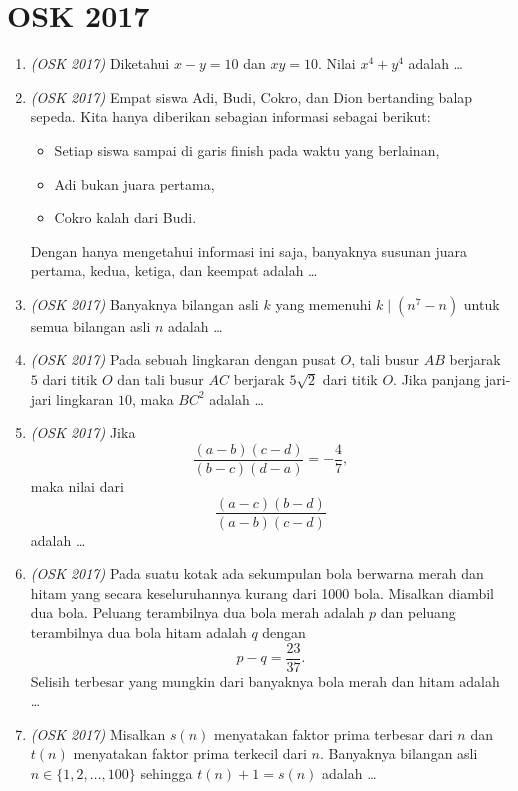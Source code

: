 \documentclass[11pt]{scrartcl}
\begin{document}
\newpage
\section{OSK 2017}

\begin{enumerate}
    \item \textit{(OSK 2017)}  Diketahui $x - y = 10$ dan $xy = 10$. Nilai $x^4 + y^4$ adalah \dots

    \item \textit{(OSK 2017)}  Empat siswa Adi, Budi, Cokro, dan Dion bertanding balap sepeda. Kita hanya diberikan sebagian informasi sebagai berikut:
    \begin{itemize}
        \item Setiap siswa sampai di garis finish pada waktu yang berlainan,
        \item Adi bukan juara pertama,
        \item Cokro kalah dari Budi.
    \end{itemize}
    Dengan hanya mengetahui informasi ini saja, banyaknya susunan juara pertama, kedua, ketiga, dan keempat adalah \dots

    \item \textit{(OSK 2017)}  Banyaknya bilangan asli $k$ yang memenuhi $k \mid (n^7 - n)$ untuk semua bilangan asli $n$ adalah \dots

    \item \textit{(OSK 2017)}  Pada sebuah lingkaran dengan pusat $O$, tali busur $AB$ berjarak $5$ dari titik $O$ dan tali busur $AC$ berjarak $5\sqrt{2}$ dari titik $O$. Jika panjang jari-jari lingkaran $10$, maka $BC^2$ adalah \dots

    \item \textit{(OSK 2017)}  Jika 
    \[
    \frac{(a - b)(c - d)}{(b - c)(d - a)} = -\frac{4}{7},
    \]
    maka nilai dari 
    \[
    \frac{(a - c)(b - d)}{(a - b)(c - d)}
    \]
    adalah \dots

    \item \textit{(OSK 2017)}  Pada suatu kotak ada sekumpulan bola berwarna merah dan hitam yang secara keseluruhannya kurang dari 1000 bola. Misalkan diambil dua bola. Peluang terambilnya dua bola merah adalah $p$ dan peluang terambilnya dua bola hitam adalah $q$ dengan
    \[
    p - q = \frac{23}{37}.
    \]
    Selisih terbesar yang mungkin dari banyaknya bola merah dan hitam adalah \dots

    \item \textit{(OSK 2017)}  Misalkan $s(n)$ menyatakan faktor prima terbesar dari $n$ dan $t(n)$ menyatakan faktor prima terkecil dari $n$. Banyaknya bilangan asli $n \in \{1, 2, \dots, 100\}$ sehingga $t(n) + 1 = s(n)$ adalah \dots


\end{enumerate}
\end{document}
